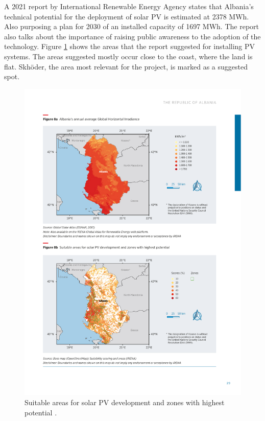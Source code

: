 A 2021 report by International Renewable Energy Agency states that Albania's technical potential for the deployment of solar PV is estimated at 2378 MWh. Also purposing a plan for 2030 of an installed capacity of 1697 MWh\citep{irena_renewables_2021}. The report also talks about the importance of raising public awareness to the adoption of the technology. Figure \ref{fig:back-albaniacapacitymap} shows the areas that the report suggested for installing PV systems. The areas suggested mostly occur close to the coast, where the land is flat. Skhöder, the area most relevant for the project, is marked as a suggested spot. 

\begin{figure}[H]
    \centering
    \includegraphics[width=\linewidth]{photos/Albania_solarPVCapacity_map.pdf}
    \caption{Suitable areas for solar PV development and zones with highest potential \citep{irena_renewables_2021}.}
    \label{fig:back-albaniacapacitymap}
\end{figure}

